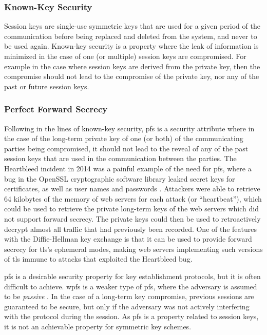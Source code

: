 \subsubsection{Known-Key Security}

Session keys are single-use symmetric keys that are used for a given period of the communication before being replaced and deleted from the system, and never to be used again. Known-key security is a property where the leak of information is minimized in the case of one (or multiple) session keys are compromised. For example in the case where session keys are derived from the private key, then the compromise should not lead to the compromise of the private key, nor any of the past or future session keys. 

\subsubsection{Perfect Forward Secrecy}

Following in the lines of known-key security, \gls{pfs} is a security attribute where in the case of the long-term private key of one (or both) of the communicating parties being compromised, it should not lead to the reveal of any of the past session keys that are used in the communication between the parties. The Heartbleed incident in 2014 was a painful example of the need for \gls{pfs}, where a bug in the OpenSSL cryptographic software library leaked secret keys for certificates, as well as user names and passwords \cite{durumeric2014matter}. Attackers were able to retrieve 64 kilobytes of the memory of web servers for each attack (or ``heartbeat''), which could be used to retrieve the private long-term keys of the web servers which did not support forward secrecy. The private keys could then be used to retroactively decrypt almost all traffic that had previously been recorded. One of the features with the Diffie-Hellman key exchange is that it can be used to provide forward secrecy for \gls{tls}'s ephemeral modes, making web servers implementing such versions of \gls{tls} immune to attacks that exploited the Heartbleed bug.  



\gls{pfs} is a desirable security property for key establishment protocols, but it is often difficult to achieve. \gls{wpfs} is a weaker type of \gls{pfs}, where the adversary is assumed to be \emph{passive} \cite{krawczyk2005hmqv}. In the case of a long-term key compromise, previous sessions are guaranteed to be secure, but only if the adversary was not actively interfering with the protocol during the session.  As \gls{pfs} is a property related to session keys, it is not an achievable property for symmetric key schemes.

